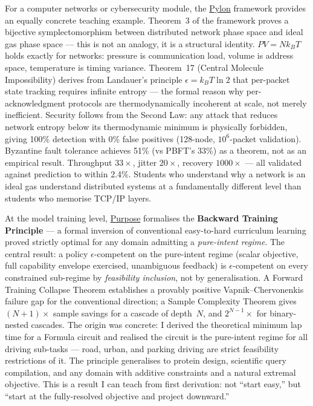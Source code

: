 \documentclass[12pt,a4paper]{article}
\begin{document}
For a computer networks or cybersecurity module, the
\href{https://github.com/fullscreen-triangle/pylon}{Pylon} framework provides
an equally concrete teaching example. Theorem~3 of the framework proves a
bijective symplectomorphism between distributed network phase space and ideal
gas phase space --- this is not an analogy, it is a structural identity.
$PV = Nk_BT$ holds exactly for networks: pressure is communication load,
volume is address space, temperature is timing variance.
Theorem~17 (Central Molecule Impossibility) derives from Landauer's principle
$\epsilon = k_B T \ln 2$ that per-packet state tracking requires infinite entropy ---
the formal reason why per-acknowledgment protocols are thermodynamically
incoherent at scale, not merely inefficient.
Security follows from the Second Law: any attack that reduces network entropy
below its thermodynamic minimum is physically forbidden, giving 100\% detection
with 0\% false positives (128-node, $10^6$-packet validation).
Byzantine fault tolerance achieves 51\% (vs PBFT's 33\%) as a theorem, not
as an empirical result.
Throughput $33\times$, jitter $20\times$, recovery $1000\times$ --- all
validated against prediction to within 2.4\%.
Students who understand why a network is an ideal gas understand distributed
systems at a fundamentally different level than students who memorise TCP/IP layers.

At the model training level, \href{https://github.com/fullscreen-triangle/purpose}{Purpose}
formalises the \textbf{Backward Training Principle} --- a formal inversion of
conventional easy-to-hard curriculum learning proved strictly optimal for any domain
admitting a \emph{pure-intent regime}.
The central result: a policy $\epsilon$-competent on the pure-intent regime (scalar
objective, full capability envelope exercised, unambiguous feedback) is
$\epsilon$-competent on every constrained sub-regime by \emph{feasibility inclusion},
not by generalisation.
A Forward Training Collapse Theorem establishes a provably positive
Vapnik--Chervonenkis failure gap for the conventional direction; a Sample Complexity
Theorem gives $(N+1)\times$ sample savings for a cascade of depth~$N$, and
$2^{N-1}\times$ for binary-nested cascades.
The origin was concrete: I derived the theoretical minimum lap time for a Formula
circuit and realised the circuit is the pure-intent regime for all driving sub-tasks ---
road, urban, and parking driving are strict feasibility restrictions of it.
The principle generalises to protein design, scientific query compilation, and any
domain with additive constraints and a natural extremal objective.
This is a result I can teach from first derivation: not ``start easy,'' but
``start at the fully-resolved objective and project downward.''
\end{document}
